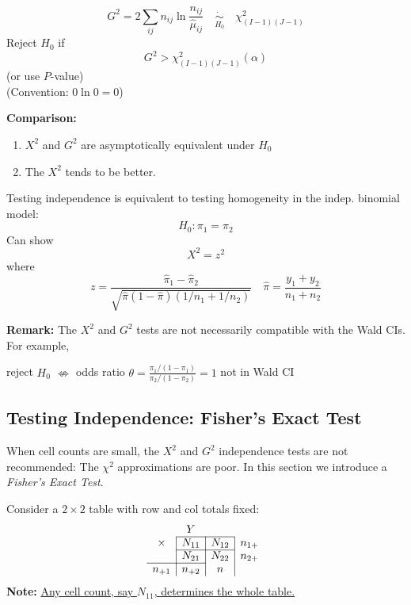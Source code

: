 \documentclass[11pt]{elegantbook}
\begin{document}
\begin{definition}
    $$G^2=2\sum_{i j}n_{ij} \ln \frac{n_{i j}}{\hat{\mu}_{i j}} \quad \underset{H_0}{\dot{\sim}}\quad \chi_{(I-1)(J-1)}^2$$
    Reject $H_0$ if
    $$G^2>\chi_{(I-1)(J-1)}^2(\alpha)$$
    (or use $P$-value)\\
    (Convention: $0 \ln 0 = 0$)
\end{definition}
\textbf{Comparison:}
\begin{enumerate}
    \item $X^2$ and $G^2$ are asymptotically equivalent under $H_0$
    \item The $X^2$ tends to be better.
\end{enumerate}
\begin{example}
    Testing independence is equivalent to testing homogeneity in the indep. binomial model:
    $$
    H_0: \pi_1=\pi_2
    $$
    Can show
    $$
    X^2=z^2
    $$
    where
    $$
    z=\frac{\hat{\pi}_1-\hat{\pi}_2}{\sqrt{\hat{\pi}(1-\hat{\pi})\left(1 / n_1+1 / n_2\right)}} \quad \hat{\pi}=\frac{y_1+y_2}{n_1+n_2}
    $$
\end{example}
\textbf{Remark:} The $X^2$ and $G^2$ tests are not necessarily compatible with the Wald CIs. For example,
\begin{center}
    reject $H_0$ $\nLeftrightarrow$  odds ratio $\theta =\frac{\pi_1/(1-\pi_1)}{\pi_2/(1-\pi_2)}= 1$ not in Wald CI
\end{center}

\subsection{Testing Independence: Fisher's Exact Test}
When cell counts are small, the $X^2$ and $G^2$ independence tests are not recommended: The $\chi^2$ approximations are poor. In this section we introduce a \textit{Fisher's Exact Test}.

Consider a $2 \times 2$ table with row and col totals fixed:
$$
\begin{array}{c|c|c|c}
\multicolumn{3}{c}{Y} \\
\cline { 2 - 3 } \times & N_{11} & N_{12} & n_{1+} \\
\cline { 2 - 3 } & N_{21} & N_{22} & n_{2+} \\
\cline { 1 - 2 } n_{+1} & n_{+2} & n
\end{array}
$$
\textbf{Note:} \underline{Any cell count, say $N_{11}$, determines the whole table.}
\end{document}
